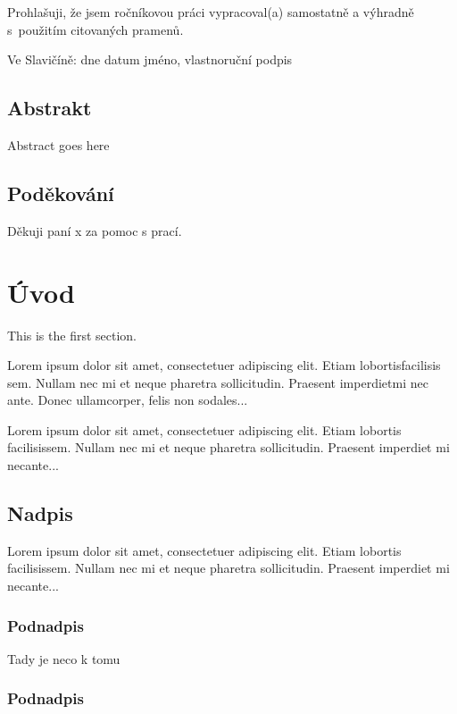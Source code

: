 \documentclass[a4paper,12pt,oneside]{book}
\begin{document}
\newpage
\thispagestyle{empty}
\mbox{}
\newpage


\noindent
Prohlašuji, že jsem ročníkovou práci vypracoval(a) samostatně a výhradně s použitím citovaných pramenů.

Ve Slavičíně: dne datum jméno, vlastnoruční podpis


\newpage
\section*{Abstrakt}
Abstract goes here

\newpage
\section*{Poděkování}
Děkuji paní x za pomoc s prací.

\tableofcontents

\thispagestyle{fancy}

\chapter{Úvod}
\thispagestyle{fancy}

This is the first section.

Lorem  ipsum  dolor  sit  amet,  consectetuer  adipiscing
elit.   Etiam  lobortisfacilisis sem.  Nullam nec mi et
neque pharetra sollicitudin.  Praesent imperdietmi nec ante.
Donec ullamcorper, felis non sodales...


Lorem ipsum dolor sit amet, consectetuer adipiscing elit.
Etiam lobortis facilisissem.  Nullam nec mi et neque pharetra
sollicitudin.  Praesent imperdiet mi necante...

\section{Nadpis}

Lorem ipsum dolor sit amet, consectetuer adipiscing elit.
Etiam lobortis facilisissem.  Nullam nec mi et neque pharetra
sollicitudin.  Praesent imperdiet mi necante...

\subsection{Podnadpis}

Tady je neco k tomu

\subsection{Podnadpis}
\end{document}
